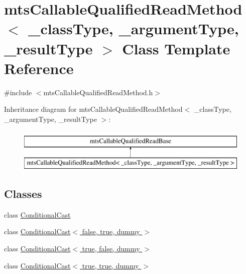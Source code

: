 \hypertarget{classmts_callable_qualified_read_method}{\section{mts\-Callable\-Qualified\-Read\-Method$<$ \-\_\-class\-Type, \-\_\-argument\-Type, \-\_\-result\-Type $>$ Class Template Reference}
\label{classmts_callable_qualified_read_method}
}


{\ttfamily \#include $<$mts\-Callable\-Qualified\-Read\-Method.\-h$>$}

Inheritance diagram for mts\-Callable\-Qualified\-Read\-Method$<$ \-\_\-class\-Type, \-\_\-argument\-Type, \-\_\-result\-Type $>$\-:\begin{figure}[H]
\begin{center}
\leavevmode
\includegraphics[height=2.000000cm]{d1/d80/classmts_callable_qualified_read_method}
\end{center}
\end{figure}
\subsection*{Classes}
\begin{DoxyCompactItemize}
\item 
class \hyperlink{classmts_callable_qualified_read_method_1_1_conditional_cast}{Conditional\-Cast}
\item 
class \hyperlink{classmts_callable_qualified_read_method_1_1_conditional_cast_3_01false_00_01true_00_01dummy_01_4}{Conditional\-Cast$<$ false, true, dummy $>$}
\item 
class \hyperlink{classmts_callable_qualified_read_method_1_1_conditional_cast_3_01true_00_01false_00_01dummy_01_4}{Conditional\-Cast$<$ true, false, dummy $>$}
\item 
class \hyperlink{classmts_callable_qualified_read_method_1_1_conditional_cast_3_01true_00_01true_00_01dummy_01_4}{Conditional\-Cast$<$ true, true, dummy $>$}
\end{DoxyCompactItemize}
